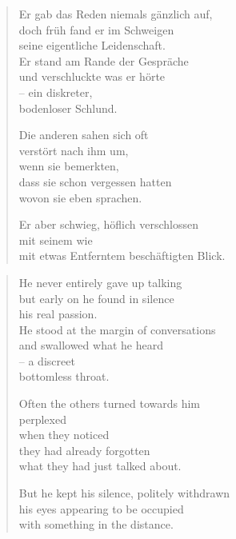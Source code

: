 
\cleartoverso


\begin{verse}
Er gab das Reden niemals gänzlich auf,\\
doch früh fand er im Schweigen\\
seine eigentliche Leidenschaft.\\
Er stand am Rande der Gespräche\\
und verschluckte was er hörte\\
-- ein diskreter,\\
bodenloser Schlund.

Die anderen sahen sich oft\\
verstört nach ihm um,\\
wenn sie bemerkten,\\
dass sie schon vergessen hatten\\
wovon sie eben sprachen.

Er aber schwieg, höflich verschlossen\\
mit seinem wie\\
mit etwas Entferntem beschäftigten Blick.
\end{verse}

\cleartorecto


\begin{verse}
He never entirely gave up talking\\
but early on he found in silence\\
his real passion.\\
He stood at the margin of conversations\\
and swallowed what he heard\\
-- a discreet\\
bottomless throat.

Often the others turned towards him\\
perplexed\\
when they noticed\\
they had already forgotten\\
what they had just talked about.

But he kept his silence, politely withdrawn\\
his eyes appearing to be occupied\\
with something in the distance.
\end{verse}

